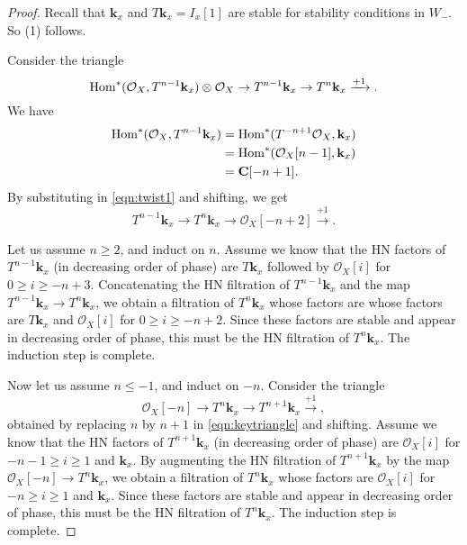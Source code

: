 \documentclass{amsart}
\begin{document}
\begin{proof}
  Recall that \(\mathbf{k}_x\) and \(T \mathbf{k}_x = I_x[1]\) are stable for stability conditions in \(W_-\).
  So (1) follows.

  Consider the triangle
  \begin{equation}\label{eqn:twist1}
    \operatorname{Hom}^{*}(\mathcal{O}_X, T^{n-1} \mathbf{k}_x) \otimes \mathcal{O}_X \to T^{n-1} \mathbf{k}_x \to T^n \mathbf{k}_x \xrightarrow{+1}.
  \end{equation}
  We have
  \begin{align*}
    \operatorname{Hom}^{*}(\mathcal{O}_X, T^{n-1} \mathbf{k}_x) &= \operatorname{Hom}^{*}(T^{-n+1} \mathcal{O}_{X}, \mathbf{k}_x)\\
                                                  &= \operatorname{Hom}^{*}(\mathcal{O}_X[n-1], \mathbf{k}_x) \\
    &= \mathbf{C}[-n+1].
  \end{align*}
  By substituting in \eqref{eqn:twist1} and shifting, we get
  \begin{equation}\label{eqn:keytriangle}
    T^{n-1}\mathbf{k}_x \to T^n \mathbf{k}_x \to \mathcal{O}_{X} [-n+2] \xrightarrow{+1}.
  \end{equation}

  Let us assume \(n \geq 2\), and induct on \(n\).
  Assume we know that the HN factors of \(T^{n-1} \mathbf{k}_x\) (in decreasing order of phase) are \(T\mathbf{k}_{x}\) followed by \(\mathcal{O}_X[i]\) for \(0 \geq i \geq -n+3\).
  Concatenating the HN filtration of \(T^{n-1} \mathbf{k}_x\) and the map \(T^{n-1}\mathbf{k}_x \to T^n \mathbf{k}_x\), we obtain a filtration of \(T^n \mathbf{k}_x\) whose factors are whose factors are \(T \mathbf{k}_x\) and \(\mathcal{O}_X[i]\) for \(0 \geq i \geq -n+2\).
  Since these factors are stable and appear in decreasing order of phase, this must be the HN filtration of \(T^n \mathbf{k}_x\).
  The induction step is complete.

  Now let us assume \(n \leq -1\), and induct on \(-n\).
  Consider the triangle
  \begin{equation}\label{eqn:keytriangle2}
    \mathcal{O}_{X} [-n] \to T^{n}\mathbf{k}_x \to T^{n+1} \mathbf{k}_x \xrightarrow{+1},
  \end{equation}
  obtained by replacing \(n\) by \(n+1\) in \eqref{eqn:keytriangle} and shifting.
  Assume we know that the HN factors of \(T^{n+1} \mathbf{k}_x\) (in decreasing order of phase) are \(\mathcal{O}_X[i]\) for \(-n-1 \geq i \geq 1\) and \(\mathbf{k}_x\).
  By augmenting the HN filtration of \(T^{n+1} \mathbf{k}_x\) by the map \(\mathcal{O}_X[-n] \to T^n \mathbf{k}_x\), we obtain a filtration of \(T^n \mathbf{k}_x\) whose factors are \(\mathcal{O}_X[i]\) for \(-n \geq i \geq 1\) and \(\mathbf{k}_x\).
  Since these factors are stable and appear in decreasing order of phase, this must be the HN filtration of \(T^n \mathbf{k}_x\).
   The induction step is complete.
 \end{proof}
\end{document}
